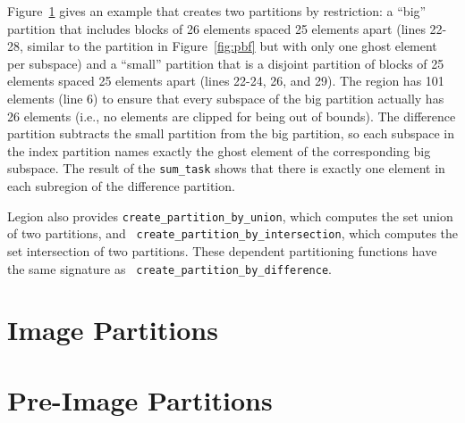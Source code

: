 Figure~\ref{fig:sets} gives an example that creates two partitions by restriction: a ``big'' partition that includes blocks of 26 elements spaced 25 elements apart (lines 22-28, similar to  the partition in Figure~\ref{fig:pbf} but with only one ghost element per subspace) and a ``small'' partition that is a disjoint partition of blocks of 25 elements spaced 25 elements apart (lines 22-24, 26, and 29). The region has 101 elements (line 6) to ensure that every subspace of the big partition actually has 26 elements (i.e., no elements are clipped for being out of bounds).  The difference partition subtracts the small partition from the big partition, so each subspace in the index partition names exactly the ghost element of the corresponding big subspace.  The result of the {\tt sum\_task} shows that there is exactly one element in each subregion of the difference partition.

Legion also provides {\tt create\_partition\_by\_union}, which
computes the set union of two partitions, and {\tt
  create\_partition\_by\_intersection}, which computes the set intersection
of two partitions.  These dependent
partitioning functions have the same signature as {\tt
  create\_partition\_by\_difference}.


\begin{figure}
  {\small
   
  }
  \caption{}
  \label{fig:sets}
\end{figure}


\section{Image Partitions}
\label{sec:image}

\begin{figure}
  {\small
    
  }
  \caption{}
  \label{fig:image}
\end{figure}

\section{Pre-Image Partitions}
\label{sec:preimage}

\begin{figure}
  {\small
   
  }
  \caption{}
  \label{fig:preimage}
\end{figure}

